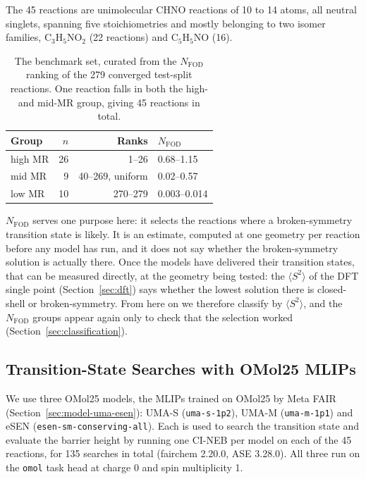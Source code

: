 The 45 reactions are unimolecular CHNO reactions of 10 to 14 atoms, all neutral
singlets, spanning five stoichiometries and mostly belonging to two isomer
families, C$_3$H$_5$NO$_2$ (22 reactions) and C$_5$H$_5$NO (16).


\begin{table}[H]
\caption{The benchmark set, curated from the $N_\mathrm{FOD}$ ranking of
the 279 converged test-split reactions. One reaction falls in both the
high- and mid-MR group, giving 45 reactions in total.}
\label{tab:strata}
\centering
\begin{tabular}{lrrl}
\toprule
Group & $n$ & Ranks & $N_\mathrm{FOD}$ \\
\midrule
high MR & 26 & 1--26            & 0.68--1.15 \\
mid MR  &  9 & 40--269, uniform & 0.02--0.57 \\
low MR  & 10 & 270--279         & 0.003--0.014 \\
\bottomrule
\end{tabular}
\end{table}

$N_\mathrm{FOD}$ serves one purpose here: it selects the reactions
where a broken-symmetry transition state is likely. It is an estimate,
computed at one geometry per reaction before any model has run, and
it does not say whether the broken-symmetry solution is actually
there. Once the models have delivered their transition states, that
can be measured directly, at the geometry being tested: the
$\langle S^2\rangle$ of the DFT single point (Section~\ref{sec:dft})
says whether the lowest solution there is closed-shell or
broken-symmetry. From here on we therefore classify by
$\langle S^2\rangle$, and the $N_\mathrm{FOD}$ groups appear again
only to check that the selection worked
(Section~\ref{sec:classification}).


\subsection{Transition-State Searches with OMol25 MLIPs}
\label{sec:neb}

We use three OMol25 models, the MLIPs trained on OMol25 by Meta FAIR
(Section~\ref{sec:model-uma-esen}): UMA-S (\texttt{uma-s-1p2}), UMA-M
(\texttt{uma-m-1p1}) and eSEN (\texttt{esen-sm-conserving-all}). Each
is used to search the transition state and evaluate the barrier height by running one CI-NEB per model on each of the
45 reactions, for 135 searches in total (fairchem 2.20.0, ASE 3.28.0). All three
run on the \texttt{omol} task head at charge 0 and spin multiplicity 1. %

